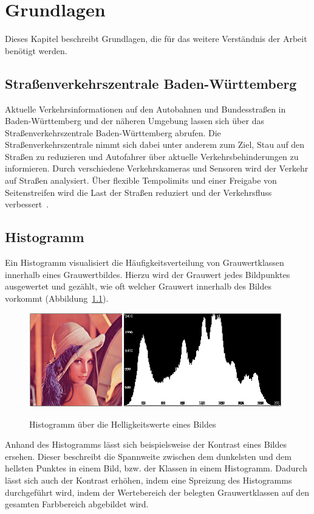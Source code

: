 \chapter{Grundlagen}

Dieses Kapitel beschreibt Grundlagen, die für das weitere Verständnis der Arbeit benötigt werden.

\section{Straßenverkehrszentrale Baden-Württemberg} %
Aktuelle Verkehrsinformationen auf den Autobahnen und Bundesstraßen in Baden-Württemberg und der näheren Umgebung lassen sich über das Straßenverkehrszentrale Baden-Württemberg abrufen. Die Straßenverkehrszentrale nimmt sich dabei unter anderem zum Ziel, Stau auf den Straßen zu reduzieren und Autofahrer über aktuelle Verkehrsbehinderungen zu informieren.
Durch verschiedene Verkehrskameras und Sensoren wird der Verkehr auf Straßen analysiert. Über flexible Tempolimits und einer Freigabe von Seitenstreifen wird die Last der Straßen reduziert und der Verkehrsfluss verbessert~\cite{svzbw}.

\section{Histogramm} %
Ein Histogramm visualisiert die Häufigkeitsverteilung von Grauwertklassen innerhalb eines Grauwertbildes.
Hierzu wird der Grauwert jedes Bildpunktes ausgewertet und gezählt, wie oft welcher Grauwert innerhalb des Bildes vorkommt (Abbildung~\ref{fig:Histogramm}).

\begin{figure}[ht]
   \centering
     \includegraphics[width=11cm]{Bilder/histogram} \\
 \caption{Histogramm über die Helligkeitswerte eines Bildes}
 \label{fig:Histogramm}
\end{figure}

Anhand des Histogramms lässt sich beispielsweise der Kontrast eines Bildes ersehen. 
Dieser beschreibt die Spannweite zwischen dem dunkelsten und dem hellsten Punktes in einem Bild, bzw. der Klassen in einem Histogramm.
Dadurch lässt sich auch der Kontrast erhöhen, indem eine Spreizung des Histogramms durchgeführt wird, indem
der Wertebereich der belegten Grauwertklassen auf den gesamten Farbbereich abgebildet wird.

